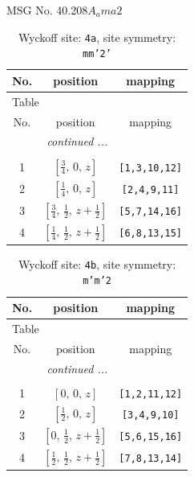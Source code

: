 \documentclass[fleqn,8pt]{jsarticle}
\begin{document}
\setcounter{MaxMatrixCols}{32}

\renewcommand{\tablename}{Table~}
\renewcommand{\figurename}{Figure~}
\begin{center}
\LARGE
MSG No. 40.208\quad$A_{a}ma2$
\end{center}
\renewcommand{\arraystretch}{1.2}
\begin{longtable}{ccc}
\caption{Wyckoff site: {\tt 4a}, site symmetry: {\tt mm'2'}}
 \\
 \hline \hline
No. & position & mapping \\ \hline \endfirsthead

\multicolumn{2}{l}{\tablename\ \thetable{}} \\
 \hline \hline
No. & position & mapping \\ \hline \endhead

 \hline \hline
\multicolumn{2}{r}{\footnotesize\it continued ...} \\ \endfoot

 \hline \hline
\multicolumn{2}{r}{} \\ \endlastfoot

1 & $\left[ \frac{3}{4},\, 0,\, z \right]$ & {\tt [1,3,10,12]} \\ \hline
2 & $\left[ \frac{1}{4},\, 0,\, z \right]$ & {\tt [2,4,9,11]} \\ \hline
3 & $\left[ \frac{3}{4},\, \frac{1}{2},\, z + \frac{1}{2} \right]$ & {\tt [5,7,14,16]} \\ \hline
4 & $\left[ \frac{1}{4},\, \frac{1}{2},\, z + \frac{1}{2} \right]$ & {\tt [6,8,13,15]} \\
\end{longtable}
\renewcommand{\arraystretch}{1.2}
\begin{longtable}{ccc}
\caption{Wyckoff site: {\tt 4b}, site symmetry: {\tt m'm'2}}
 \\
 \hline \hline
No. & position & mapping \\ \hline \endfirsthead

\multicolumn{2}{l}{\tablename\ \thetable{}} \\
 \hline \hline
No. & position & mapping \\ \hline \endhead

 \hline \hline
\multicolumn{2}{r}{\footnotesize\it continued ...} \\ \endfoot

 \hline \hline
\multicolumn{2}{r}{} \\ \endlastfoot

1 & $\left[ 0,\, 0,\, z \right]$ & {\tt [1,2,11,12]} \\ \hline
2 & $\left[ \frac{1}{2},\, 0,\, z \right]$ & {\tt [3,4,9,10]} \\ \hline
3 & $\left[ 0,\, \frac{1}{2},\, z + \frac{1}{2} \right]$ & {\tt [5,6,15,16]} \\ \hline
4 & $\left[ \frac{1}{2},\, \frac{1}{2},\, z + \frac{1}{2} \right]$ & {\tt [7,8,13,14]} \\
\end{longtable}
\end{document}

